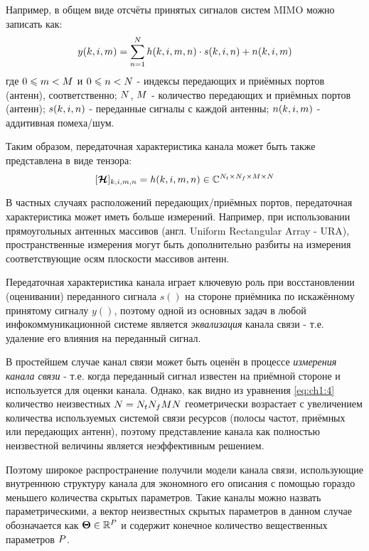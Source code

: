 Например, в общем виде отсчёты принятых сигналов систем MIMO можно записать как:
\begin{equation}
\label{eq:ch1:3}
y(k,i,{m}) = \sum_{{n}=1}^{{N}} h(k,i,{m},{n})\cdot s(k,i,{n}) + n(k,i,{m})
\end{equation}
где $0\leqslant{m}<{M}$ и $0\leqslant{n}<{N}$ - индексы передающих и приёмных портов (антенн), соответственно; ${N}$, ${M}$ - количество передающих и приёмных портов (антенн); $s(k,i,{n})$ - переданные сигналы с каждой антенны; $n(k,i,{m})$ - аддитивная помеха/шум.

Таким образом, передаточная характеристика канала может быть также представлена в виде тензора:
\begin{equation}
\label{eq:ch1:4}
[\boldsymbol{\mathcal H}]_{k,i,{m},{n}}=h(k,i,{m},{n})\in\mathbb{C}^{N_t\times N_f \times {M} \times {N}}
\end{equation}

В частных случаях расположений передающих/приёмных портов, передаточная характеристика может иметь больше измерений. Например, при использовании прямоугольных антенных массивов (англ. Uniform Rectangular Array - URA), пространственные измерения могут быть дополнительно разбиты на измерения соответствующие осям плоскости массивов антенн.

Передаточная характеристика канала играет ключевую роль при восстановлении (оценивании) переданного сигнала $s()$ на стороне приёмника по искажённому принятому сигналу $y()$, поэтому одной из основных задач в любой инфокоммуникационной системе является \textit{эквализация} канала связи - т.е. удаление его влияния на переданный сигнал. 

В простейшем случае канал связи может быть оценён в процессе \textit{измерения канала связи} - т.е. когда переданный сигнал известен на приёмной стороне и используется для оценки канала. Однако, как видно из уравнения \eqref{eq:ch1:4} количество неизвестных $N=N_tN_f{M}{N}$ геометрически возрастает с увеличением количества используемых системой связи ресурсов (полосы частот, приёмных или передающих антенн), поэтому представление канала как полностью неизвестной величины является неэффективным решением.

Поэтому широкое распространение получили модели канала связи, использующие внутреннюю структуру канала для экономного его описания с помощью гораздо меньшего количества скрытых параметров. Такие каналы можно назвать параметрическими, а вектор неизвестных скрытых параметров в данном случае обозначается как ${\boldsymbol{\Theta}}\in\mathbb{R}^{P}$ и содержит конечное количество вещественных параметров ${P}$.

